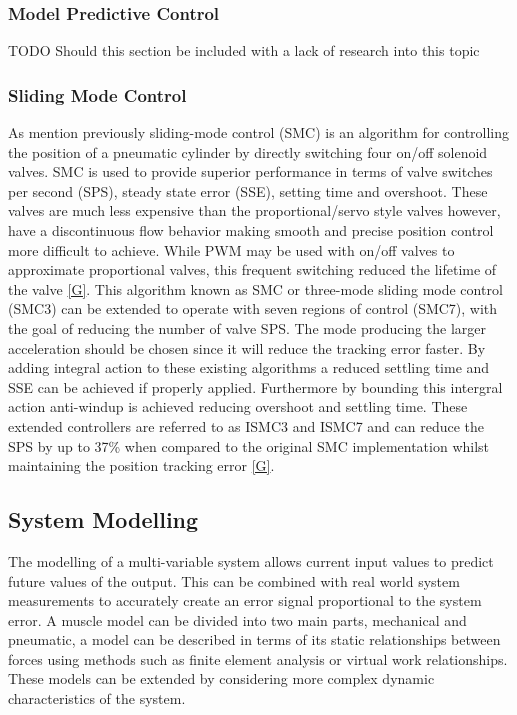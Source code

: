 \documentclass[11pt,a4paper]{article}
\begin{document}
\subsubsection{Model Predictive Control}
\label{sub:model_predictive_control}
TODO Should this section be included with a lack of research into this topic

\subsubsection{Sliding Mode Control}
\label{sub:sliding_mode_control}
As mention previously sliding-mode control (SMC) is an algorithm for controlling the position of a pneumatic cylinder by directly switching four on/off solenoid valves. SMC is used to provide superior performance in terms of valve switches per second (SPS), steady state error (SSE), setting time and overshoot. These valves are much less expensive than the proportional/servo style valves however, have a discontinuous flow behavior making smooth and precise position control more difficult to achieve. While PWM may be used with on/off valves to approximate proportional valves, this frequent switching reduced the lifetime of the valve \ref{G}. \newline
This algorithm known as SMC or three-mode sliding mode control (SMC3) can be extended to operate with seven regions of control (SMC7), with the goal of reducing the number of valve SPS. The mode producing the larger acceleration should be chosen since it will reduce the tracking error faster. By adding integral action to these existing algorithms a reduced settling time and SSE can be achieved if properly applied. Furthermore by bounding this intergral action anti-windup is achieved reducing overshoot and settling time. These extended controllers are referred to as ISMC3 and ISMC7 and can reduce the SPS by up to 37\% when compared to the original SMC implementation whilst maintaining the position tracking error \ref{G}.

\subsection{System Modelling}
\label{sub:system_modelling}
The modelling of a multi-variable system allows current input values to predict future values of the output. This can be combined with real world system measurements to accurately create an error signal proportional to the system error. A muscle model can be divided into two main parts, mechanical and pneumatic, a model can be described in terms of its static relationships between forces using methods such as finite element analysis or virtual work relationships. These models can be extended by considering more complex dynamic characteristics of the system.
\end{document}

